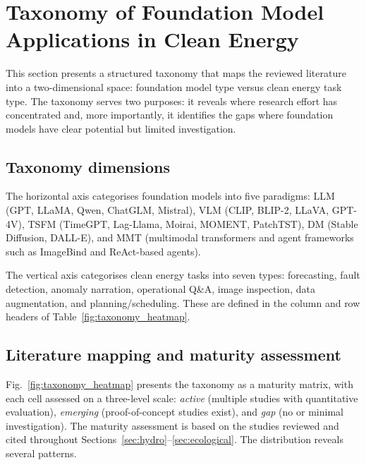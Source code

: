 \documentclass[preprint,12pt]{elsarticle}
\begin{document}
\section{Taxonomy of Foundation Model Applications in Clean Energy}
\label{sec:taxonomy}

This section presents a structured taxonomy that maps the reviewed literature into a two-dimensional space: foundation model type versus clean energy task type. The taxonomy serves two purposes: it reveals where research effort has concentrated and, more importantly, it identifies the gaps where foundation models have clear potential but limited investigation.

\subsection{Taxonomy dimensions}
\label{subsec:taxonomy_dimensions}

{ The horizontal axis categorises foundation models into five paradigms: LLM (GPT, LLaMA, Qwen, ChatGLM, Mistral), VLM (CLIP, BLIP-2, LLaVA, GPT-4V), TSFM (TimeGPT, Lag-Llama, Moirai, MOMENT, PatchTST), DM (Stable Diffusion, DALL-E), and MMT (multimodal transformers and agent frameworks such as ImageBind and ReAct-based agents).\par}

The vertical axis categorises clean energy tasks into seven types: forecasting, fault detection, anomaly narration, operational Q\&A, image inspection, data augmentation, and planning/scheduling. These are defined in the column and row headers of Table~\ref{fig:taxonomy_heatmap}.

\subsection{Literature mapping and maturity assessment}
\label{subsec:lit_distribution}

Fig.~\ref{fig:taxonomy_heatmap} presents the taxonomy as a maturity matrix, with each cell assessed on a three-level scale: \textit{active} (multiple studies with quantitative evaluation), \textit{emerging} (proof-of-concept studies exist), and \textit{gap} (no or minimal investigation). The maturity assessment is based on the studies reviewed and cited throughout Sections~\ref{sec:hydro}--\ref{sec:ecological}. The distribution reveals several patterns.
\end{document}
